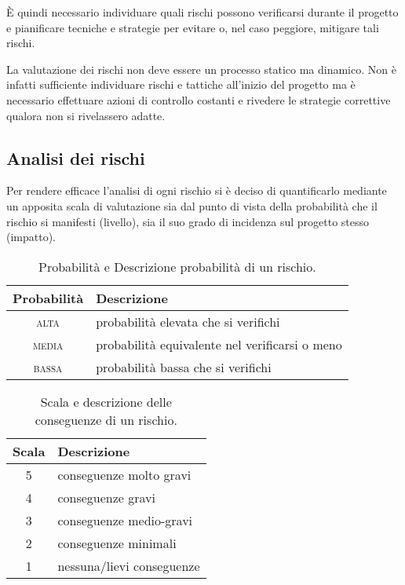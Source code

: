 È quindi necessario individuare quali rischi possono verificarsi durante il progetto e pianificare tecniche e strategie per evitare o, nel caso peggiore, mitigare tali rischi.

La valutazione dei rischi non deve essere un processo statico ma dinamico. Non è infatti sufficiente individuare rischi e tattiche all'inizio del progetto ma è necessario effettuare azioni di controllo costanti e rivedere le strategie correttive qualora non si rivelassero adatte. 

\subsection{Analisi dei rischi}

\newcommand{\hi}{\textsc{alta}}
\newcommand{\lo}{\textsc{bassa}}
\newcommand{\med}{\textsc{media}}
Per rendere efficace l'analisi di ogni rischio si è deciso di quantificarlo mediante un apposita scala di valutazione sia dal punto di vista della probabilità che il rischio si manifesti (livello), sia il suo grado di incidenza sul progetto stesso (impatto).

\begin{table}[h!]
\centering
{}
\begin{tabular}{p{}p{}}
\toprule
\bfseries\sffamily{}Probabilità& \bfseries\sffamily{}Descrizione\\
\midrule
\multicolumn{1}{c}{\hi} & probabilità elevata che si verifichi\\
\multicolumn{1}{c}{\med} & probabilità equivalente nel verificarsi o meno\\
\multicolumn{1}{c}{\lo} & probabilità bassa che si verifichi\\
\bottomrule
\end{tabular}
\caption{Probabilità e Descrizione probabilità di un rischio.}\label{tab:livellorischi}
\end{table}

\begin{table}[H]
\centering
{}
\begin{tabular}{p{}p{}}
\toprule
\bfseries\sffamily{}Scala& \bfseries\sffamily{}Descrizione  \\
\midrule
\multicolumn{1}{c}{5} & conseguenze molto gravi\\
\multicolumn{1}{c}{4} & conseguenze gravi\\
\multicolumn{1}{c}{3} & conseguenze medio-gravi\\
\multicolumn{1}{c}{2} & conseguenze minimali\\
\multicolumn{1}{c}{1} & nessuna/lievi conseguenze\\
\bottomrule
\end{tabular}
\caption{Scala e descrizione delle conseguenze di un rischio.}\label{tab:impattorischi}
\end{table}

